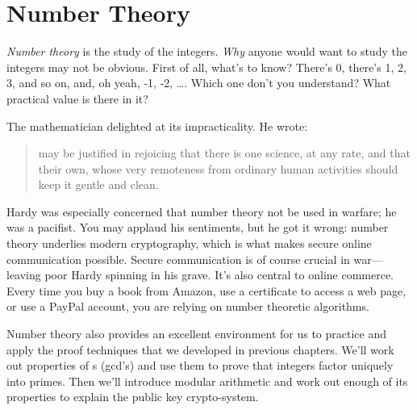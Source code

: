 \chapter{Number Theory}\label{number_theory_chap}

\emph{Number theory} is the study of the
integers.  \emph{Why} anyone would want to study the integers may not
be obvious.  First of all, what's to know?  There's 0, there's 1, 2,
3, and so on, and, oh yeah, -1, -2, \dots.  Which one don't you
understand?  What practical value is there in it?

\iffalse Number theory is at the core of mathematics; even Ug the
Caveman surely had some grasp of the integers---at least the positive
ones.  In fact, the integers are so elementary that one might ask,
``What's to study?''  There's 0, there's 1, 2, 3 and so on, and
there's the negatives.  Which one don't you understand?  Doesn't math
become easy when we don't have to worry about nasty numbers like
$\sqrt{7}$, $1 / \pi$ and $i$?  We can even forget about fractions!
\fi

The mathematician  delighted 
at its impracticality.  He wrote:

 \begin{quotation}
  may be justified in rejoicing that there
 is one science, at any rate, and that their own, whose very
 remoteness from ordinary human activities should keep it gentle and
 clean.
 \end{quotation}

Hardy was especially concerned that number theory not be used in
warfare; he was a pacifist.  You may applaud his sentiments, but he
got it wrong: number theory underlies modern cryptography, which is
what makes secure online communication possible.  Secure communication
is of course crucial in war---leaving poor Hardy spinning in
his grave.  It's also central to online commerce.  Every time you buy
a book from Amazon, use a certificate to access a web page, or use a
PayPal account, you are relying on number theoretic algorithms.

Number theory also provides an excellent environment for us to
practice and apply the proof techniques that we developed in previous
chapters.  We'll work out properties of s
(gcd's) and use them to prove that integers factor uniquely into
primes.  Then we'll introduce modular arithmetic and work out enough
of its properties to explain the  public key crypto-system.

